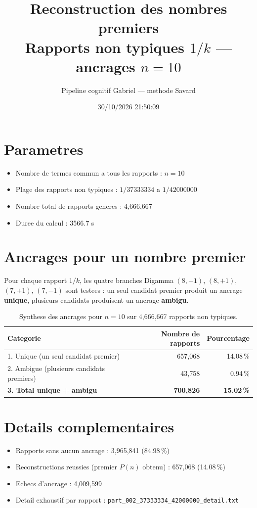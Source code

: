 \documentclass[12pt]{article}
\title{Reconstruction des nombres premiers\\Rapports non typiques $1/k$ --- ancrages $n=10$
}
\author{Pipeline cognitif Gabriel --- methode Savard}
\date{30/10/2026 21:50:09}
\begin{document}
\maketitle

\section*{Parametres}
\begin{itemize}
\item Nombre de termes commun a tous les rapports : $n=10$
\item Plage des rapports non typiques : $1/37333334$ a $1/42000000$
\item Nombre total de rapports generes : 4,666,667
\item Duree du calcul : 3566.7 s
\end{itemize}

\section*{Ancrages pour un nombre premier}

Pour chaque rapport $1/k$, les quatre branches Digamma $(8,-1)$, $(8,+1)$, $(7,+1)$, $(7,-1)$ sont testees : un seul candidat premier produit un ancrage \textbf{unique}, plusieurs candidats produisent un ancrage \textbf{ambigu}.

\begin{table}[h!]
\centering
\caption{Synthese des ancrages pour $n=10$ sur 4,666,667 rapports non typiques.}
\begin{tabular}{lrr}
\toprule
\textbf{Categorie} & \textbf{Nombre de rapports} & \textbf{Pourcentage} \\
\midrule
1. Unique (un seul candidat premier) & 657,068 & 14.08\,\% \\
2. Ambigue (plusieurs candidats premiers) & 43,758 & 0.94\,\% \\
\midrule
\textbf{3. Total unique + ambigu} & \textbf{700,826} & \textbf{15.02\,\%} \\
\bottomrule
\end{tabular}
\end{table}

\section*{Details complementaires}
\begin{itemize}
\item Rapports sans aucun ancrage : 3,965,841 (84.98\,\%)
\item Reconstructions reussies (premier $P(n)$ obtenu) : 657,068 (14.08\,\%)
\item Echecs d'ancrage : 4,009,599
\item Detail exhaustif par rapport : \texttt{part_002_37333334_42000000_detail.txt}
\end{itemize}
\end{document}
